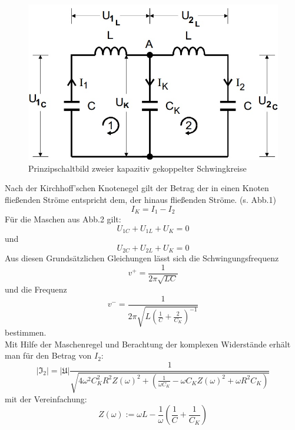 \begin{figure}[h]
        \centering
        \includegraphics[scale=0.5]{Grafiken/V355Abb1.jpg}
        \caption{Prinzipschaltbild zweier kapazitiv gekoppelter Schwingkreise}
        \label{fig:Abb1}
\end{figure}
Nach der Kirchhoff'schen Knotenegel gilt der Betrag der in einen Knoten fließenden Ströme entspricht dem, der hinaus fließenden Ströme. (s. Abb.1)
\begin{equation}
I_K = I_1 - I_2
\end{equation}
Für die Maschen aus Abb.2 gilt:
\begin{equation}
U_{1C} + U_{1L} + U_K = 0
\end{equation}
und
\begin{equation}
U_{2C} + U_{2L} + U_K = 0
\end{equation}
Aus diesen Grundsätzlichen Gleichungen lässt sich die Schwingungsfrequenz
\begin{equation}
v^+ = \frac{1}{2 \pi \sqrt{L C}}
\end{equation}
und die Frequenz
\begin{equation}
v^- = \frac{1}{2 \pi \sqrt{L\left(\frac{1}{C} + \frac{2}{C_K}\right)^{-1}}}
\end{equation}
bestimmen. \\
Mit Hilfe der Maschenregel und Berachtung der komplexen Widerstände erhält man für den Betrag von $I_2$:
\begin{equation}
|\mathfrak{I}_2| = |\mathfrak{U}| \frac{1}{\sqrt{4 \omega^2 C_K^2 R^2 Z(\omega )^2 + \left(\frac{1}{\omega C_K} - \omega C_K Z(\omega )^2 + \omega R^2 C_K\right)}}
\end{equation}
mit der Vereinfachung:
\begin{equation*}
Z(\omega ) := \omega L - \frac{1}{\omega } \left(\frac{1}{C} + \frac{1}{C_K}\right) 
\end{equation*}
